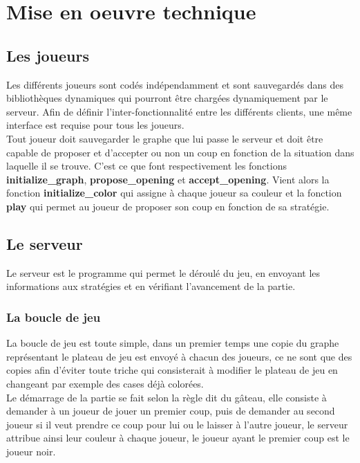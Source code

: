 \section{Mise en oeuvre technique}


\subsection{Les joueurs}
\label{sec:joueurs}

Les différents joueurs sont codés indépendamment et sont sauvegardés dans des bibliothèques dynamiques qui pourront être chargées dynamiquement par le serveur.
Afin de définir l'inter-fonctionnalité entre les différents clients, une même interface est requise pour tous les joueurs.\\
Tout joueur doit sauvegarder le graphe que lui passe le serveur et doit être capable de proposer et d'accepter ou non un coup en fonction de la situation dans laquelle il se trouve. C'est ce que font respectivement les fonctions \textbf{initialize\_graph}, \textbf{propose\_opening} et \textbf{accept\_opening}. Vient alors la fonction \textbf{initialize\_color} qui assigne à chaque joueur sa couleur et la fonction \textbf{play} qui permet au joueur de proposer son coup en fonction de sa stratégie.

\subsection{Le serveur}

Le serveur est le programme qui permet le déroulé du jeu, en envoyant les informations aux stratégies et en vérifiant l'avancement de la partie.

\subsubsection{La boucle de jeu}

La boucle de jeu est toute simple, dans un premier temps une copie du graphe représentant le plateau de jeu est envoyé à chacun des joueurs, ce ne sont que des copies afin d'éviter toute triche qui consisterait à modifier le plateau de jeu en changeant par exemple des cases déjà colorées.\\

Le démarrage de la partie se fait selon la règle dit du gâteau, elle consiste à demander à un joueur de jouer un premier coup, puis de demander au second joueur si il veut prendre ce coup pour lui ou le laisser à l'autre joueur, le serveur attribue ainsi leur couleur à chaque joueur, le joueur ayant le premier coup est le joueur noir.\\

